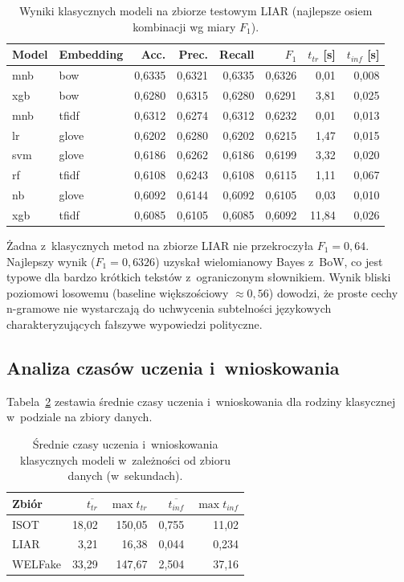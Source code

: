 \documentclass[oneside,polski,logo]{amuthesis}
\begin{document}
\begin{table}[ht]
\centering
\caption{Wyniki klasycznych modeli na zbiorze testowym LIAR
(najlepsze osiem kombinacji wg miary $F_1$).}
\label{tab:klas_liar}
\begin{tabular}{llrrrrrr}
\toprule
Model & Embedding & Acc. & Prec. & Recall & $F_1$ & $t_{tr}$ [s] & $t_{inf}$ [s] \\
\midrule
mnb & bow      & 0,6335 & 0,6321 & 0,6335 & 0,6326 & 0,01  & 0,008 \\
xgb & bow      & 0,6280 & 0,6315 & 0,6280 & 0,6291 & 3,81  & 0,025 \\
mnb & tfidf    & 0,6312 & 0,6274 & 0,6312 & 0,6232 & 0,01  & 0,013 \\
lr  & glove    & 0,6202 & 0,6280 & 0,6202 & 0,6215 & 1,47  & 0,015 \\
svm & glove    & 0,6186 & 0,6262 & 0,6186 & 0,6199 & 3,32  & 0,020 \\
rf  & tfidf    & 0,6108 & 0,6243 & 0,6108 & 0,6115 & 1,11  & 0,067 \\
nb  & glove    & 0,6092 & 0,6144 & 0,6092 & 0,6105 & 0,03  & 0,010 \\
xgb & tfidf    & 0,6085 & 0,6105 & 0,6085 & 0,6092 & 11,84 & 0,026 \\
\bottomrule
\end{tabular}
\end{table}

Żadna z~klasycznych metod na zbiorze LIAR nie przekroczyła \(F_1 = 0{,}64\).
Najlepszy wynik (\(F_1 = 0{,}6326\)) uzyskał wielomianowy Bayes z~BoW,
co jest typowe dla bardzo krótkich tekstów z~ograniczonym słownikiem.
Wynik bliski poziomowi losowemu (baseline większościowy \(\approx 0{,}56\))
dowodzi, że proste cechy n-gramowe nie wystarczają do uchwycenia subtelności
językowych charakteryzujących fałszywe wypowiedzi polityczne.

\subsection{Analiza czasów uczenia i~wnioskowania}
\label{sec:wyniki_klasyczne_czas}

Tabela~\ref{tab:klas_czasy} zestawia średnie czasy uczenia i~wnioskowania
dla rodziny klasycznej w~podziale na zbiory danych.

\begin{table}[ht]
\centering
\caption{Średnie czasy uczenia i~wnioskowania klasycznych modeli
w~zależności od zbioru danych (w~sekundach).}
\label{tab:klas_czasy}
\begin{tabular}{lrrrr}
\toprule
Zbiór & $\overline{t_{tr}}$ & $\max{t_{tr}}$ & $\overline{t_{inf}}$ & $\max{t_{inf}}$ \\
\midrule
ISOT    & 18,02  & 150,05 & 0,755 & 11,02  \\
LIAR    & 3,21   & 16,38  & 0,044 & 0,234  \\
WELFake & 33,29  & 147,67 & 2,504 & 37,16  \\
\bottomrule
\end{tabular}
\end{table}
\end{document}
